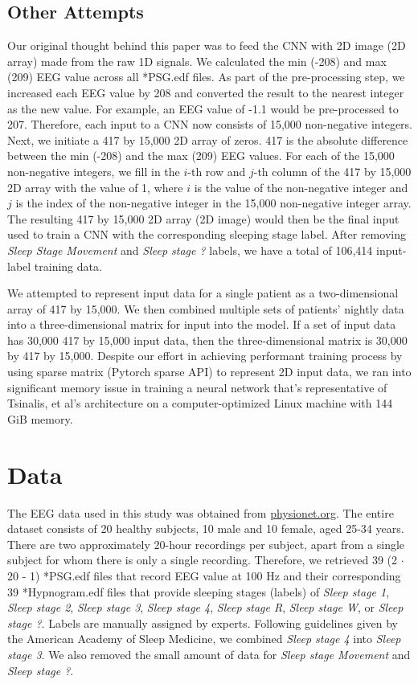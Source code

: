 \documentclass{amia}
\begin{document}
\subsection*{Other Attempts}

Our original thought behind this paper was to feed the CNN with 2D image (2D array) made from the raw 1D signals. We calculated the min (-208) and max (209) EEG value across all *PSG.edf files. As part of the pre-processing step, we increased each EEG value by 208 and converted the result to the nearest integer as the new value. For example, an EEG value of -1.1 would be pre-processed to 207. Therefore, each input to a CNN now consists of 15,000 non-negative integers. Next, we initiate a 417 by 15,000 2D array of zeros. 417 is the absolute difference between the min (-208) and the max (209) EEG values. For each of the 15,000 non-negative integers, we fill in the $i$-th row and $j$-th column of the 417 by 15,000 2D array with the value of 1, where $i$ is the value of the non-negative integer and $j$ is the index of the non-negative integer in the 15,000 non-negative integer array. The resulting 417 by 15,000 2D array (2D image) would then be the final input used to train a CNN with the corresponding sleeping stage label. After removing \textit{Sleep Stage Movement} and \textit{Sleep stage ?} labels, we have a total of 106,414 input-label training data.

We attempted to represent input data for a single patient as a two-dimensional array of 417 by 15,000. We then combined multiple sets of patients’ nightly data into a three-dimensional matrix for input into the model. If a set of input data has 30,000 417 by 15,000 input data, then the three-dimensional matrix is 30,000 by 417 by 15,000. Despite our effort in achieving performant training process by using sparse matrix (Pytorch sparse API) to represent 2D input data, we ran into significant memory issue in training a neural network that's representative of Tsinalis, et al's architecture on a computer-optimized Linux machine with 144 GiB memory. 


\section*{Data}
The EEG data used in this study was obtained from \href{http://physionet.org}{physionet.org}\cite{ref_PhysioNet}. The entire dataset consists of 20 healthy subjects, 10 male and 10 female, aged 25-34 years. There are two approximately 20-hour recordings per subject, apart from a single subject for whom there is only a single recording. Therefore, we retrieved 39 (2 $\cdot $ 20 - 1) *PSG.edf files that record EEG value at 100 Hz and their corresponding 39 *Hypnogram.edf files that provide sleeping stages (labels) of \textit{Sleep stage 1}, \textit{Sleep stage 2}, \textit{Sleep stage 3}, \textit{Sleep stage 4}, \textit{Sleep stage R}, \textit{Sleep stage W}, or \textit{Sleep stage ?}. Labels are manually assigned by experts. Following guidelines given by the American Academy of Sleep Medicine, we combined \textit{Sleep stage 4} into \textit{Sleep stage 3}. We also removed the small amount of data for \textit{Sleep stage Movement} and \textit{Sleep stage ?}. 
\end{document}
